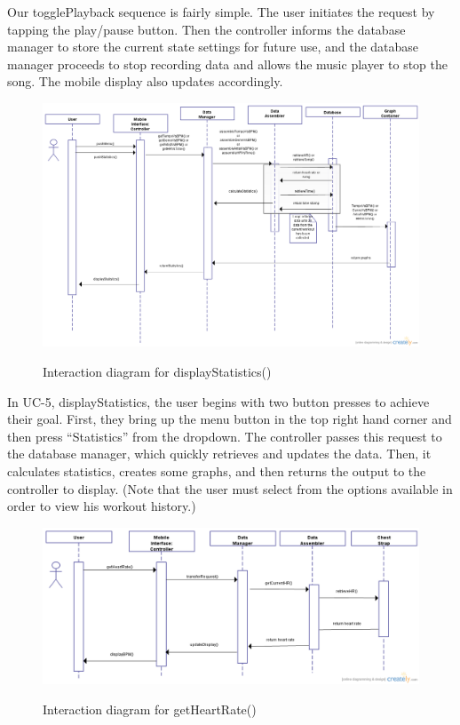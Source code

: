 \documentclass[letterpaper,english, 12pt]{scrreprt}
\begin{document}
Our togglePlayback sequence is fairly simple. The user initiates the request by tapping the play/pause button. Then the controller informs the database manager to store the current state settings for future use, and the database manager proceeds to stop recording data and allows the music player to stop the song. The mobile display also updates accordingly.

\begin{figure}[H]
	\includegraphics[scale=.35]{img/Interaction_Diagrams/displayStatistics.png}\\
	\caption {Interaction diagram for displayStatistics()} 
\end{figure}
In UC-5, displayStatistics, the user begins with two button presses to achieve their goal. First, they bring up the menu button in the top right hand corner and then press ``Statistics'' from the dropdown. The controller passes this request to the database manager, which quickly retrieves and updates the data. Then, it calculates statistics, creates some graphs, and then returns the output to the controller to display. (Note that the user must select from the options available in order to view his workout history.)

\begin{figure}[H]
	\includegraphics[scale=.40]{img/Interaction_Diagrams/getHeartRate.png}\\
	\caption {Interaction diagram for getHeartRate()} 
\end{figure}
\end{document}
